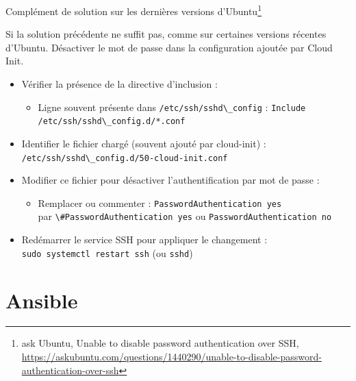 \documentclass{beamer}
\begin{document}
    \begin{frame}{Complément de solution sur les dernières versions d'Ubuntu\footnote{ask Ubuntu, Unable to disable password authentication over SSH, \url{https://askubuntu.com/questions/1440290/unable-to-disable-password-authentication-over-ssh}}}
        \begin{dangercolorbox}
            Si la solution précédente ne suffit pas, comme sur certaines versions récentes d'Ubuntu.
            Désactiver le mot de passe dans la configuration ajoutée par Cloud Init.
        \end{dangercolorbox}
        \begin{footnotesize}
            \begin{itemize}
                \item Vérifier la présence de la directive d’inclusion :
                \begin{itemize}
                    \item Ligne souvent présente dans \lstinline{/etc/ssh/sshd\_config} :
                    \lstinline{Include /etc/ssh/sshd\_config.d/*.conf}
                \end{itemize}
                \item Identifier le fichier chargé (souvent ajouté par cloud-init) :
                \lstinline{/etc/ssh/sshd\_config.d/50-cloud-init.conf}
                \item Modifier ce fichier pour désactiver l’authentification par mot de passe :
                \begin{itemize}
                    \item Remplacer ou commenter :
                    \lstinline{PasswordAuthentication yes} \\
                    par \lstinline{\#PasswordAuthentication yes} ou \lstinline{PasswordAuthentication no}
                \end{itemize}
                \item Redémarrer le service SSH pour appliquer le changement :
                \\
                \lstinline{sudo systemctl restart ssh} (ou \lstinline{sshd})
            \end{itemize}
        \end{footnotesize}
    \end{frame}


    \section{Ansible}\label{sec:ansible}
\end{document}
